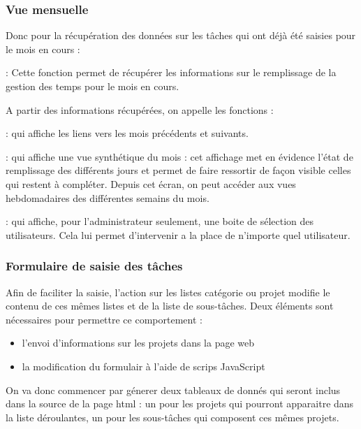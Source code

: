 \subsubsection{Vue mensuelle}

 Donc pour la récupération des données sur les tâches qui ont déjà été saisies pour le mois en cours :
 \begin{description}
  \item{} : Cette fonction permet de récupérer les informations sur le remplissage de la gestion des temps pour le mois en cours.
 \end{description}

 A partir des informations récupérées, on appelle les fonctions :
 \begin{description}
  \item{} : qui affiche les liens vers les mois précédents et suivants.
  \item{} : qui affiche une vue synthétique du mois : cet affichage met en évidence l'état de remplissage des différents jours et permet de faire ressortir de façon visible celles qui restent à compléter. Depuis cet écran, on peut accéder aux vues hebdomadaires des différentes semains du mois.
  \item{} : qui affiche, pour l'administrateur seulement, une boite de sélection des utilisateurs. Cela lui permet d'intervenir a la place de n'importe quel utilisateur.
 \end{description}

\subsubsection{Formulaire de saisie des tâches}

Afin de faciliter la saisie, l'action sur les listes catégorie ou projet modifie le contenu de ces mêmes listes et de la liste de sous-tâches.
Deux éléments sont nécessaires pour permettre ce comportement :
\begin{itemize}
\item{l'envoi d'informations sur les projets dans la page web}
\item{la modification du formulair à l'aide de scrips JavaScript}
\end{itemize}

On va donc commencer par génerer deux tableaux de donnés qui seront inclus dans la source de la page html : un pour les projets qui pourront apparaitre dans la liste déroulantes, un pour les sous-tâches qui composent ces mêmes projets.

